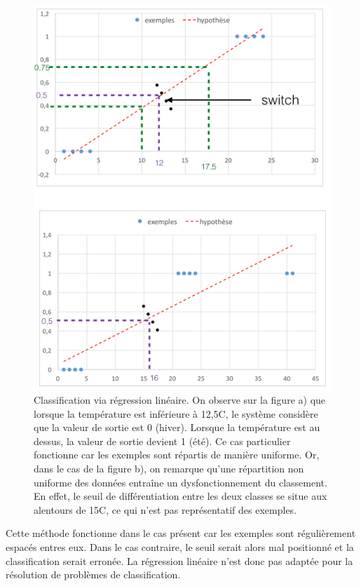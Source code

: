 \begin{figure}[h]
	\centering\includegraphics[width=12cm]{images/class_reg_lineaire.png}
	\caption[Classification via régression linéaire]{Classification via régression linéaire. On observe sur la figure a) que lorsque la température est inférieure à 12,5\degres C, le système considère que la valeur de sortie est 0 (hiver). Lorsque la température est au dessus, la valeur de sortie devient 1 (été). Ce cas particulier fonctionne car les exemples sont répartis de manière uniforme. Or, dans le cas de la figure b), on remarque qu'une répartition non uniforme des données entraîne un dysfonctionnement du classement. En effet, le seuil de différentiation entre les deux classes se situe aux alentours de  15\degres C, ce qui n'est pas représentatif des exemples.}
	\label{fig:Classification via regression linéaire}
\end{figure}

Cette méthode fonctionne dans le cas présent car les exemples sont régulièrement espacés entres eux. Dans le cas contraire, le seuil serait alors mal positionné et la classification serait erronée. La régression linéaire n'est donc pas adaptée pour la résolution de problèmes de classification. 

